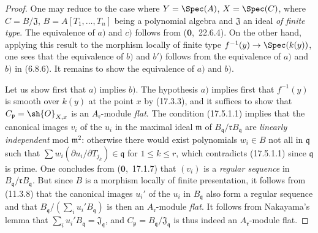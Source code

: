 \begin{proof}
One may reduce to the case where $Y=\Spec(A)$, $X=\Spec(C)$, where $C=B/\mathfrak{J}$, $B=A[T_1,\ldots,T_n]$ being a polynomial algebra and $\mathfrak{J}$ an ideal \emph{of finite type}.
The equivalence of $a)$ and $c)$ follows from ($\mathbf{0}$,~22.6.4).
On the other hand, applying this result to the morphism locally of finite type $f^{-1}(y)\to\Spec(k(y))$, one sees that the equivalence of $b)$ and $b')$ follows from the equivalence of $a)$ and $b)$ in (6.8.6).
It remains to show the equivalence of $a)$ and $b)$.

Let us show first that $a)$ implies $b)$.
The hypothesis $a)$ implies first that $f^{-1}(y)$ is smooth over $k(y)$ at the point $x$ by (17.3.3), and it suffices to show that $C_\mathfrak{p}=\sh{O}_{X,x}$ is an $A_\mathfrak{r}$-module \emph{flat}.
The condition (17.5.1.1) implies that the canonical images $v_i$ of the $u_i$ in the maximal ideal $\mathfrak{m}$ of $B_\mathfrak{q}/\mathfrak{r} B_\mathfrak{q}$ are \emph{linearly independent} mod $\mathfrak{m}^2$: otherwise there would exist polynomials $w_i\in B$ not all in $\mathfrak{q}$ such that $\sum w_i(\partial u_i/\partial T_{j_k})\in\mathfrak{q}$ for $1\leqslant k\leqslant r$, which contradicts (17.5.1.1) since $\mathfrak{q}$ is prime.
One concludes from ($\mathbf{0}$,~17.1.7) that $(v_i)$ is a \emph{regular sequence} in $B_\mathfrak{q}/\mathfrak{r} B_\mathfrak{q}$.
But since $B$ is a morphism locally of finite presentation, it follows from (11.3.8) that the canonical images $u_i'$ of the $u_i$ in $B_\mathfrak{q}$ also form a regular sequence and that $B_\mathfrak{q}/(\sum_i u_i' B_\mathfrak{q})$ is then an $A_\mathfrak{r}$-module \emph{flat}.
It follows from Nakayama's lemma that $\sum_i u_i' B_\mathfrak{q}=\mathfrak{J}_\mathfrak{q}$, and $C_\mathfrak{p}=B_\mathfrak{q}/\mathfrak{J}_\mathfrak{q}$ is thus indeed an $A_\mathfrak{r}$-module flat.


\end{proof}
